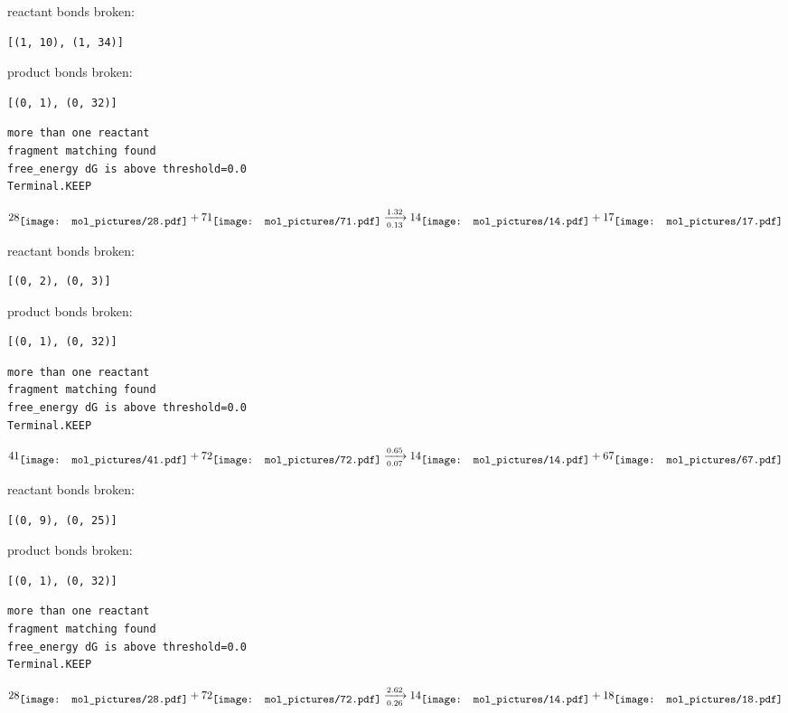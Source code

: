 \documentclass{article}
\begin{document}
reactant bonds broken:\begin{verbatim}
[(1, 10), (1, 34)]
\end{verbatim}
product bonds broken:\begin{verbatim}
[(0, 1), (0, 32)]
\end{verbatim}




\vspace{1cm}
\begin{verbatim}
more than one reactant
fragment matching found
free_energy dG is above threshold=0.0
Terminal.KEEP
\end{verbatim}
$$
28
\raisebox{-.5\height}{\texttt{[image: mol\_pictures/28.pdf]}}
+
71
\raisebox{-.5\height}{\texttt{[image: mol\_pictures/71.pdf]}}
\xrightarrow[0.13]{1.32}
14
\raisebox{-.5\height}{\texttt{[image: mol\_pictures/14.pdf]}}
+
17
\raisebox{-.5\height}{\texttt{[image: mol\_pictures/17.pdf]}}
$$


reactant bonds broken:\begin{verbatim}
[(0, 2), (0, 3)]
\end{verbatim}
product bonds broken:\begin{verbatim}
[(0, 1), (0, 32)]
\end{verbatim}




\vspace{1cm}
\begin{verbatim}
more than one reactant
fragment matching found
free_energy dG is above threshold=0.0
Terminal.KEEP
\end{verbatim}
$$
41
\raisebox{-.5\height}{\texttt{[image: mol\_pictures/41.pdf]}}
+
72
\raisebox{-.5\height}{\texttt{[image: mol\_pictures/72.pdf]}}
\xrightarrow[0.07]{0.65}
14
\raisebox{-.5\height}{\texttt{[image: mol\_pictures/14.pdf]}}
+
67
\raisebox{-.5\height}{\texttt{[image: mol\_pictures/67.pdf]}}
$$


reactant bonds broken:\begin{verbatim}
[(0, 9), (0, 25)]
\end{verbatim}
product bonds broken:\begin{verbatim}
[(0, 1), (0, 32)]
\end{verbatim}




\vspace{1cm}
\begin{verbatim}
more than one reactant
fragment matching found
free_energy dG is above threshold=0.0
Terminal.KEEP
\end{verbatim}
$$
28
\raisebox{-.5\height}{\texttt{[image: mol\_pictures/28.pdf]}}
+
72
\raisebox{-.5\height}{\texttt{[image: mol\_pictures/72.pdf]}}
\xrightarrow[0.26]{2.62}
14
\raisebox{-.5\height}{\texttt{[image: mol\_pictures/14.pdf]}}
+
18
\raisebox{-.5\height}{\texttt{[image: mol\_pictures/18.pdf]}}
$$
\end{document}
